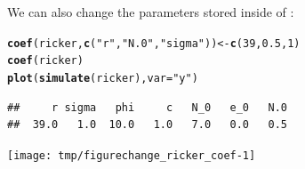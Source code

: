 \documentclass{beamer}\usepackage[]{graphicx}\usepackage[]{color}
\makeatletter
\newcommand{\hlnum}[1]{\textcolor[rgb]{0.686,0.059,0.569}{#1}}%
\newcommand{\hlstr}[1]{\textcolor[rgb]{0.192,0.494,0.8}{#1}}%
\newcommand{\hlstd}[1]{\textcolor[rgb]{0.345,0.345,0.345}{#1}}%
\newcommand{\hlkwb}[1]{\textcolor[rgb]{0.69,0.353,0.396}{#1}}%
\newcommand{\hlkwc}[1]{\textcolor[rgb]{0.333,0.667,0.333}{#1}}%
\newcommand{\hlkwd}[1]{\textcolor[rgb]{0.737,0.353,0.396}{\textbf{#1}}}%
\newenvironment{kframe}{%
 \def\at@end@of@kframe{}%
 \ifinner\ifhmode%
  \def\at@end@of@kframe{\end{minipage}}%
  \begin{minipage}{\columnwidth}%
 \fi\fi%
 \def\FrameCommand##1{\hskip\@totalleftmargin \hskip-\fboxsep
 \colorbox{shadecolor}{##1}\hskip-\fboxsep
     \hskip-\linewidth \hskip-\@totalleftmargin \hskip\columnwidth}%
 \MakeFramed {\advance\hsize-\width
   \@totalleftmargin\z@ \linewidth\hsize
   \@setminipage}}%
 {\par\unskip\endMakeFramed%
 \at@end@of@kframe}
\newenvironment{knitrout}{}{} %
\makeatother
\begin{document}
\begin{frame}[fragile]
\bi
\item We can also change the parameters stored inside of :
\ei
\begin{knitrout}\small
{}\color{fgcolor}\begin{kframe}
\begin{alltt}
\hlkwd{coef}\hlstd{(ricker,}\hlkwd{c}\hlstd{(}\hlstr{"r"}\hlstd{,}\hlstr{"N.0"}\hlstd{,}\hlstr{"sigma"}\hlstd{))} \hlkwb{<-} \hlkwd{c}\hlstd{(}\hlnum{39}\hlstd{,}\hlnum{0.5}\hlstd{,}\hlnum{1}\hlstd{)}
\hlkwd{coef}\hlstd{(ricker)}
\hlkwd{plot}\hlstd{(}\hlkwd{simulate}\hlstd{(ricker),}\hlkwc{var}\hlstd{=}\hlstr{"y"}\hlstd{)}
\end{alltt}
\end{kframe}
\end{knitrout}

\vspace{-5mm}

\begin{knitrout}\small
{}\color{fgcolor}\begin{kframe}
\begin{verbatim}
##     r sigma   phi     c   N_0   e_0   N.0 
##  39.0   1.0  10.0   1.0   7.0   0.0   0.5
\end{verbatim}
\end{kframe}

{\centering \texttt{[image: tmp/figurechange\_ricker\_coef-1]} 

}



\end{knitrout}

\end{frame}
\end{document}
